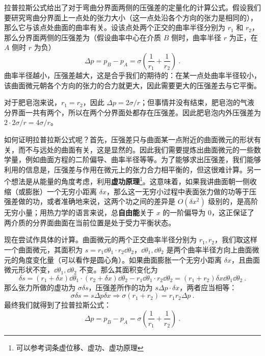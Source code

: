 拉普拉斯公式给出了对于弯曲分界面两侧的压强差的定量化的计算公式。假设我们要研究弯曲分界面上一点处的张力大小（这一点处沿各个方向的张力是相同的），那么它与该点处曲面的曲率有关。设该点处两个正交的曲率半径分别为 $r_1$ 和 $r_2$，那么分界面两侧的压强差为（假设曲率中心在介质 $B$ 侧时，曲率半径 $r$ 为正，在 $A$ 侧时 $r$ 为负）
\begin{equation}
\Delta p=p_B-p_A=\sigma(\frac{1}{r_1}+\frac{1}{r_2})~.
\end{equation}
曲率半径越小，压强差越大，这是合乎我们的期待的：在某一点处曲率半径较小，该曲面微元朝各个方向的张力的合力就更大，因此需要更大的压强差去与它平衡。

对于肥皂泡来说，$r_1=r_2$，因此 $\Delta p=2\sigma/r$；但事情并没有结束，肥皂泡的气液分界面一共有两个，所以在两个分界面处都存在压强差。因此肥皂泡内外压强差为 $2\cdot 2\sigma/r=4\sigma/r$。

如何证明拉普拉斯公式呢？首先，压强差只与曲面某一点附近的曲面微元的形状有关，而不与远处的曲面有关，这是显然的。因此我们需要提炼出曲面微元的一些数学量，例如曲面方程的二阶偏导、曲率半径等等。为了能够求出压强差，我们能够利用的信息是，压强差与作用在微元上的张力合力相平衡的，但这很难计算。另一个想法是从能量的角度考虑，利用\textbf{虚功原理}\footnote{可以参考词条虚位移、虚功、虚功原理}。这意味着，如果我讲曲面朝一侧收缩（或膨胀）一个无穷小距离 $\delta x$，那么这一无穷小过程中表面张力做的功等于压强差做的功，或者准确地来说，这两个功之间的差异是 $O(\delta x^2)$ 级别的，是高阶无穷小量；用热力学的语言来说，总\textbf{自由能}关于 $x$ 的一阶偏导为 $0$，这正保证了两介质的分界面曲面在当前位置是处于受力平衡状态。

现在尝试作具体的计算。曲面微元的两个正交曲率半径分别为 $r_1,r_2$，我们取这样一个曲面微元，其面积为 $s=r_1 \dd \theta_1 \cdot r_2 \dd \theta_2$，$\dd\theta_1,\dd\theta_2$ 是两个曲率半径方向上曲面微元的角度变化量（可以看作是圆心角）。如果曲面膨胀一个无穷小距离 $\delta x$，且曲面微元形状不变，$\dd \theta_1,\dd \theta_2$ 不变。那么其面积变化为
\begin{equation}
\delta s=(r_1+\delta x)\dd \theta_1\cdot 
(r_2+\delta x)\dd \theta_2 - r_1 \dd \theta_1 \cdot r_2 \dd \theta_2=(r_1+r_2)\delta x \dd \theta_1\dd \theta_2~.
\end{equation}
那么张力所做的虚功为 $\sigma \delta s$，压强差所作的功为 $s\Delta p \cdot \delta x$，两者应当相等：
\begin{equation}
\sigma\delta s=s\Delta p \delta x\Rightarrow \sigma(r_1+r_2)=r_1r_2\Delta p~.
\end{equation}
最终我们就得到了拉普拉斯公式：
\begin{equation}
\Delta p=p_B-p_A=\sigma(\frac{1}{r_1}+\frac{1}{r_2})~.
\end{equation}


